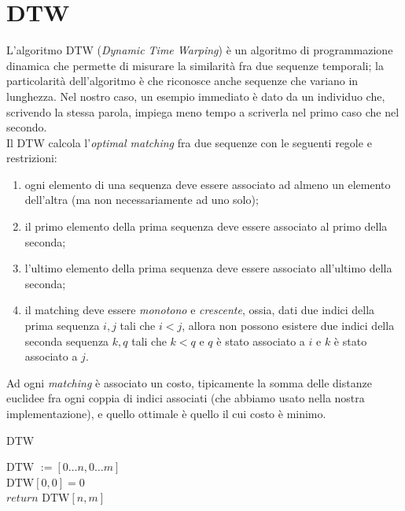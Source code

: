\documentclass[8pt,notitlepage]{report}
\begin{document}
	\section{DTW}
		L'algoritmo DTW (\textit{Dynamic Time Warping}) è un algoritmo di programmazione dinamica che permette di misurare la similarità fra due sequenze temporali; la particolarità dell'algoritmo è che riconosce anche sequenze che variano in lunghezza. Nel nostro caso, un esempio immediato è dato da un individuo che, scrivendo la stessa parola, impiega meno tempo a scriverla nel primo caso che nel secondo. \\
		Il DTW calcola l'\textit{optimal matching} fra due sequenze con le seguenti regole e restrizioni:
		\begin{enumerate}
			\item ogni elemento di una sequenza deve essere associato ad almeno un elemento dell'altra (ma non necessariamente ad uno solo);
			\item il primo elemento della prima sequenza deve essere associato al primo della seconda;
			\item l'ultimo elemento della prima sequenza deve essere associato all'ultimo della seconda;
			\item il matching deve essere \textit{monotono} e \textit{crescente}, ossia, dati due indici della prima sequenza $ i, j $ tali che $ i < j $, allora non possono esistere due indici della seconda sequenza $ k, q $ tali che $ k < q $ e $ q $ è stato associato a $ i $ e $ k $ è stato associato a $ j $.
		\end{enumerate}
		Ad ogni \textit{matching} è associato un costo, tipicamente la somma delle distanze euclidee fra ogni coppia di indici associati (che abbiamo usato nella nostra implementazione), e quello ottimale è quello il cui costo è minimo.
		\begin{algorithm}[h]
			\SetAlgoLined
			\caption{DTW}
				$ \text{DTW } :=  [0 \dots n, 0 \dots m] $ \\
				$ \text{DTW}[0, 0] = 0 $ \\
				$ \textit{return } \text{DTW}[n, m] $
		\end{algorithm}
		
\end{document}
